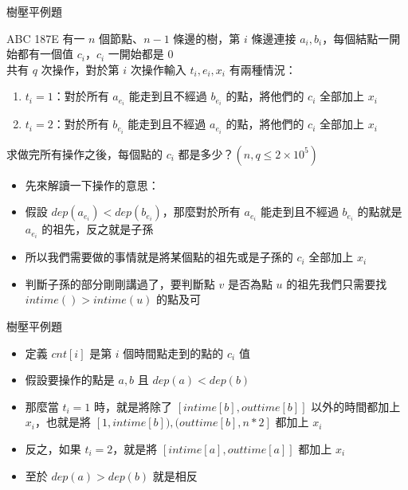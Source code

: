 \documentclass[aspectratio=169]{beamer}
\begin{document}
    \begin{frame}{樹壓平例題}
        \begin{block}{ABC 187E}
            有一 $n$ 個節點、$n-1$ 條邊的樹，第 $i$ 條邊連接 $a_i, b_i$，每個結點一開始都有一個值 $c_i$，$c_i$ 一開始都是 $0$\\
            共有 $q$ 次操作，對於第 $i$ 次操作輸入 $t_i, e_i, x_i$ 有兩種情況：
            \begin{enumerate}
                \item $t_i = 1$：對於所有 $a_{e_i}$ 能走到且不經過 $b_{e_i}$ 的點，將他們的 $c_i$ 全部加上 $x_i$
                \item $t_i = 2$：對於所有 $b_{e_i}$ 能走到且不經過 $a_{e_i}$ 的點，將他們的 $c_i$ 全部加上 $x_i$
            \end{enumerate}
            求做完所有操作之後，每個點的 $c_i$ 都是多少？$(n, q \le 2 \times 10^5)$
        \end{block}

        \begin{itemize}
            \item<1-> 先來解讀一下操作的意思：
            \item<2-> 假設 $dep(a_{e_i}) < dep(b_{e_i})$，那麼對於所有 $a_{e_i}$ 能走到且不經過 $b_{e_i}$ 的點就是 $a_{e_i}$ 的祖先，反之就是子孫
            \item<3-> 所以我們需要做的事情就是將某個點的祖先或是子孫的 $c_i$ 全部加上 $x_i$
            \item<4-> 判斷子孫的部分剛剛講過了，要判斷點 $v$ 是否為點 $u$ 的祖先我們只需要找 $intime() > intime(u)$ 的點及可
        \end{itemize}
    \end{frame}
    
    \begin{frame}{樹壓平例題}
        \begin{itemize}
            \item<1-> 定義 $cnt[i]$ 是第 $i$ 個時間點走到的點的 $c_i$ 值
            \item<1-> 假設要操作的點是 $a, b$ 且 $dep(a) < dep(b)$
            \item<2-> 那麼當 $t_i = 1$ 時，就是將除了 $[intime[b], outtime[b]]$ 以外的時間都加上 $x_i$，也就是將 $[1, intime[b]), (outtime[b], n * 2]$ 都加上 $x_i$
            \item<2-> 反之，如果 $t_i = 2$，就是將 $[intime[a], outtime[a]]$ 都加上 $x_i$
            \item<2-> 至於 $dep(a) > dep(b)$ 就是相反
        \end{itemize}
    \end{frame}
\end{document}
